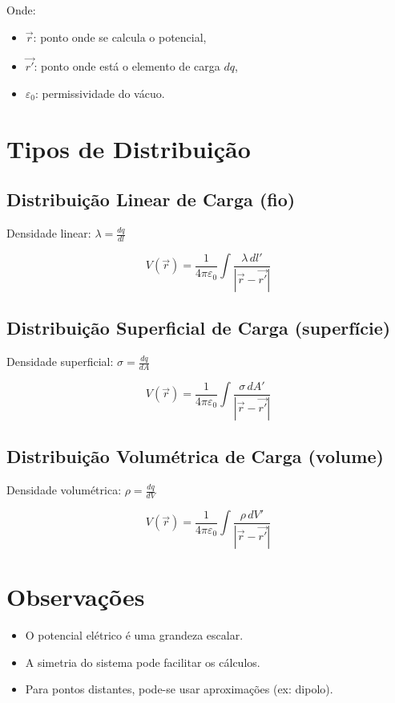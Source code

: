 \documentclass[a4paper,12pt]{article}
\begin{document}
\begin{multicols}{2}
Onde:
\begin{itemize}
  \item \( \vec{r} \): ponto onde se calcula o potencial,
  \item \( \vec{r'} \): ponto onde está o elemento de carga \( dq \),
  \item \( \varepsilon_0 \): permissividade do vácuo.
\end{itemize}

\section{Tipos de Distribuição}

\subsection{Distribuição Linear de Carga (fio)}

Densidade linear: \( \lambda = \frac{dq}{dl} \)

\[
V(\vec{r}) = \frac{1}{4\pi \varepsilon_0} \int \frac{\lambda \, dl'}{|\vec{r} - \vec{r'}|}
\]

\subsection{Distribuição Superficial de Carga (superfície)}

Densidade superficial: \( \sigma = \frac{dq}{dA} \)

\[
V(\vec{r}) = \frac{1}{4\pi \varepsilon_0} \int \frac{\sigma \, dA'}{|\vec{r} - \vec{r'}|}
\]

\subsection{Distribuição Volumétrica de Carga (volume)}

Densidade volumétrica: \( \rho = \frac{dq}{dV} \)

\[
V(\vec{r}) = \frac{1}{4\pi \varepsilon_0} \int \frac{\rho \, dV'}{|\vec{r} - \vec{r'}|}
\]

\section{Observações}

\begin{itemize}
  \item O potencial elétrico é uma grandeza escalar.
  \item A simetria do sistema pode facilitar os cálculos.
  \item Para pontos distantes, pode-se usar aproximações (ex: dipolo).
\end{itemize}


\end{multicols}
\end{document}
